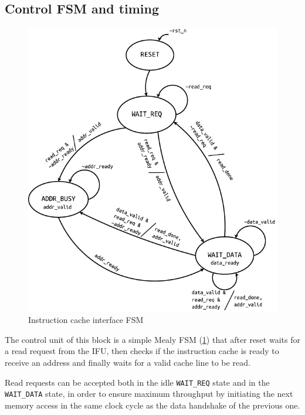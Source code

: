 \subsection{Control \acs{FSM} and timing}
\begin{figure}[hbt]
  \centering
  \includegraphics[scale=1]{img/icache_ifc_fsm.pdf}
  \caption{Instruction cache interface \acs{FSM}}
  \label{fig:icache_ifc_fsm}
\end{figure}
The control unit of this block is a simple Mealy \acs{FSM} (\cref{fig:icache_ifc_fsm}) that after reset waits for a read request from the \ac{IFU}, then checks if the instruction cache is ready to receive an address and finally waits for a valid cache line to be read.

Read requests can be accepted both in the idle \texttt{WAIT\_REQ} state and in the \texttt{WAIT\_DATA} state, in order to ensure maximum throughput by initiating the next memory access in the same clock cycle as the data handshake of the previous one.

